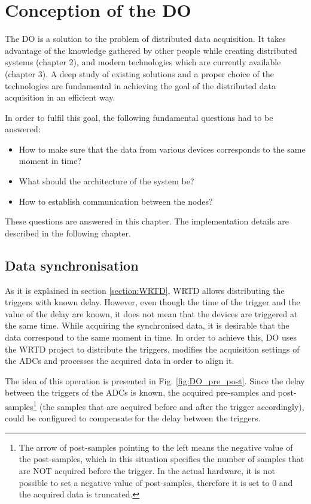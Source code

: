 \chapter{Conception of the DO}

The DO is a solution to the problem of distributed data acquisition. It takes advantage of the knowledge gathered by other people while creating distributed systems (chapter 2), and modern technologies which are currently available (chapter 3).
A deep study of existing solutions and a proper choice of the technologies are fundamental in achieving the goal of the distributed data acquisition in an efficient way.

In order to fulfil this goal, the following fundamental questions had to be answered:
\begin{itemize}
    \item How to make sure that the data from various devices corresponds to the same moment in time?
    \item What should the architecture of the system be?
    \item How to establish communication between the nodes?
\end{itemize}
These questions are answered in this chapter. The implementation details are described in the following chapter.

\section{Data synchronisation} \label{section:data_synchronisation}
    As it is explained in section \ref{section:WRTD}, WRTD allows distributing the triggers with known delay. However, even though the time of the trigger and the value of the delay are known, it does not mean that the devices are triggered at the same time. While acquiring the synchronised data, it is desirable that the data correspond to the same moment in time. In order to achieve this, DO uses the WRTD project to distribute the triggers, modifies the acquisition settings of the ADCs and processes the acquired data in order to align it.
    
    The idea of this operation is presented in Fig. \ref{fig:DO_pre_post}. Since the delay between the triggers of the ADCs is known, the acquired pre-samples and post-samples\footnote{The arrow of post-samples pointing to the left means the negative value of the post-samples, which in this situation specifies the number of samples that are NOT acquired before the trigger. In the actual hardware, it is not possible to set a negative value of post-samples, therefore it is set to 0 and the acquired data is truncated.} (the samples that are acquired before and after the trigger accordingly), could be configured to compensate for the delay between the triggers. 
    
